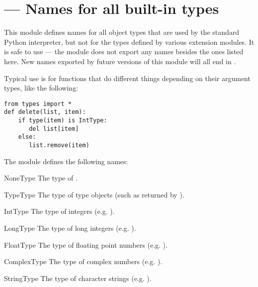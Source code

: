\section{ ---
         Names for all built-in types}



This module defines names for all object types that are used by the
standard Python interpreter, but not for the types defined by various
extension modules.  It is safe to use  ---
the module does not export any names besides the ones listed here.
New names exported by future versions of this module will all end in
.

Typical use is for functions that do different things depending on
their argument types, like the following:

\begin{verbatim}
from types import *
def delete(list, item):
    if type(item) is IntType:
       del list[item]
    else:
       list.remove(item)
\end{verbatim}

The module defines the following names:

\begin{datadesc}{NoneType}
The type of .
\end{datadesc}

\begin{datadesc}{TypeType}
The type of type objects (such as returned by
).
\end{datadesc}

\begin{datadesc}{IntType}
The type of integers (e.g. ).
\end{datadesc}

\begin{datadesc}{LongType}
The type of long integers (e.g. ).
\end{datadesc}

\begin{datadesc}{FloatType}
The type of floating point numbers (e.g. ).
\end{datadesc}

\begin{datadesc}{ComplexType}
The type of complex numbers (e.g. ).
\end{datadesc}

\begin{datadesc}{StringType}
The type of character strings (e.g. ).
\end{datadesc}

